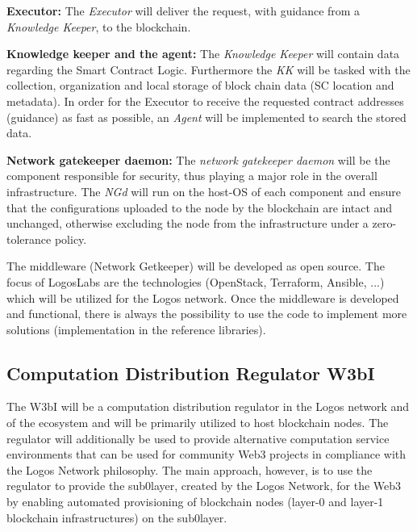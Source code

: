 \documentclass[]{article}
\begin{document}
\textbf{Executor:}
The \textit{Executor} will deliver the request, with guidance from a \textit{Knowledge Keeper}, to the blockchain.   
\newline

\textbf{Knowledge keeper and the agent:}
The \textit{Knowledge Keeper} will contain data regarding the Smart Contract Logic. 
Furthermore the \textit{KK} will be tasked with the collection, organization and local storage of block chain data (SC location and metadata). 
In order for the Executor to receive the requested contract addresses (guidance) as fast as possible, an \textit{Agent} will be implemented to search the stored data.  
\newline

\textbf{Network gatekeeper daemon:}
The \textit{network gatekeeper daemon} will be the component responsible for security, thus playing a major role in the overall infrastructure. 
The \textit{NGd} will run on the host-OS of each component and ensure that the configurations uploaded to the node by the blockchain are intact and unchanged, otherwise excluding the node from the infrastructure under a zero-tolerance policy. 
\newline

The middleware (Network Getkeeper) will be developed as open source.
The focus of LogosLabs are the technologies (OpenStack, Terraform, Ansible, ...) which will be utilized for the Logos network.
Once the middleware is developed and functional, there is always the possibility to use the code to implement more solutions (implementation in the reference libraries).  

\subsection{Computation Distribution Regulator W3bI}
The W3bI will be a computation distribution regulator in the Logos network and of the ecosystem and will be primarily utilized to host blockchain nodes.
The regulator will additionally be used to provide alternative computation service environments that can be used for community Web3 projects in compliance with the Logos Network philosophy.
The main approach, however, is to use the regulator to provide the sub0layer, created by the Logos Network, for the Web3 by enabling automated provisioning of blockchain nodes (layer-0 and layer-1 blockchain infrastructures) on the sub0layer. 
\end{document}
